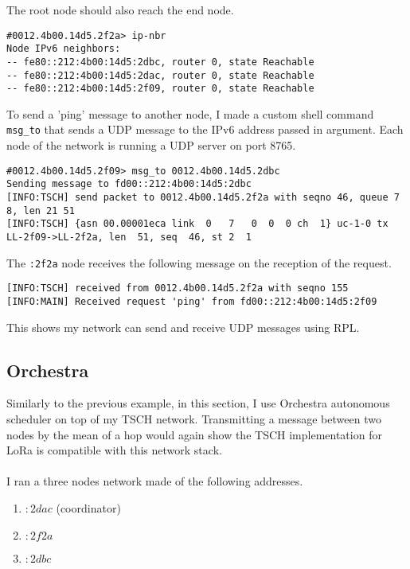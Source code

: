 The root node should also reach the end node.

\begin{lstlisting}[language=none]
#0012.4b00.14d5.2f2a> ip-nbr
Node IPv6 neighbors:
-- fe80::212:4b00:14d5:2dbc, router 0, state Reachable 
-- fe80::212:4b00:14d5:2dac, router 0, state Reachable 
-- fe80::212:4b00:14d5:2f09, router 0, state Reachable 
\end{lstlisting}

To send a 'ping' message to another node, I made a custom shell 
command \lstinline{msg_to} that sends a UDP message to the IPv6 address 
passed in argument.
Each node of the network is running a UDP server on port 8765.

\begin{lstlisting}[language=none]
#0012.4b00.14d5.2f09> msg_to 0012.4b00.14d5.2dbc
Sending message to fd00::212:4b00:14d5:2dbc
[INFO:TSCH] send packet to 0012.4b00.14d5.2f2a with seqno 46, queue 7 8, len 21 51
[INFO:TSCH] {asn 00.00001eca link  0   7   0  0  0 ch  1} uc-1-0 tx LL-2f09->LL-2f2a, len  51, seq  46, st 2  1
\end{lstlisting}

The \lstinline{:2f2a} node receives the following message on the reception of the
request.

\begin{lstlisting}[language=none]
[INFO:TSCH] received from 0012.4b00.14d5.2f2a with seqno 155
[INFO:MAIN] Received request 'ping' from fd00::212:4b00:14d5:2f09
\end{lstlisting}

This shows my network can send and receive UDP messages using RPL.

\subsection{Orchestra}

Similarly to the previous example, in this section, I use Orchestra autonomous
scheduler on top of my TSCH network.
Transmitting a message between two nodes by the mean of a hop would again show
the TSCH implementation for LoRa is compatible with this network stack.

\paragraph{}

I ran a three nodes network made of the following addresses.

\begin{enumerate}
  \item $:2dac$ (coordinator)
  \item $:2f2a$
  \item $:2dbc$
\end{enumerate}

